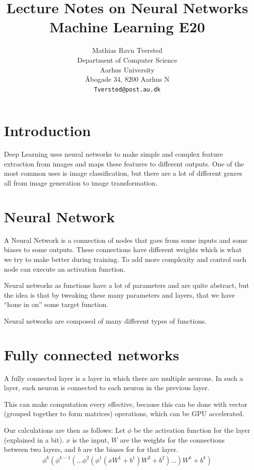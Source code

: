 \documentclass{article}
\title{Lecture Notes on Neural Networks\\Machine Learning E20}
\author{
 Mathias Ravn Tversted \\
  Department of Computer Science\\
  Aarhus University\\
  Åbogade 34, 8200 Aarhus N \\
  \texttt{Tversted@post.au.dk} \\
}
\begin{document}
\maketitle
\tableofcontents
\newpage

\section{Introduction}
  Deep Learning uses neural networks to make simple and complex feature extraction from images and maps these features to different outputs. One of the most common uses is image classification, but there are a lot of different genres all from image generation to image transformation.

\section{Neural Network}
  A Neural Network is a connection of nodes that goes from some inputs and some biases to some outputs. These connections have different weights which is what we try to make better during training. To add more complexity and control each node can execute an activation function.
  
  Neural networks as functions have a lot of parameters and are quite abstract, but the idea is that by tweaking these many parameters and layers, that we have ``hone in on'' some target function.
  
  Neural networks are composed of many different types of functions.

\section{Fully connected networks}
    A fully connected layer is a layer in which there are multiple neurons. In such a layer, each neuron is connected to each neuron in the previous layer.
    
    This can make computation every effective, because this can be done with vector (grouped together to form matrices) operations, which can be GPU accelerated.

  Our calculations are then as follows:
  Let $\phi$ be the activation function for the layer (explained in a bit). $x$ is the input, $W$ are the weights for the connections between two layers, and $b$ are the biases for for that layer.
  \begin{align}
    \phi^k(\phi^{k-1}(\dots\phi^2(\phi^1(xW^1+b^1)W^2+b^2)\dots)W^k+b^k)
  \end{align}
\end{document}
